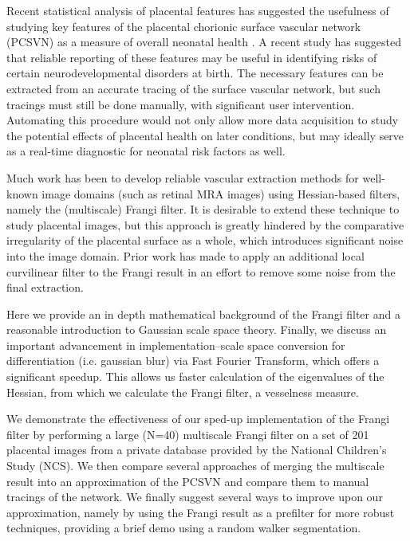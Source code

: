 

Recent statistical analysis of placental features has suggested the usefulness
of studying key features of the placental chorionic surface vascular network
(PCSVN) as a measure of overall neonatal health \cite{chang2017}. A recent
study has suggested that reliable reporting of these features may be useful in
identifying risks of certain neurodevelopmental disorders at birth. The
necessary features can be extracted from an accurate tracing of the surface
vascular network, but such tracings must still be done manually, with
significant user intervention. Automating this procedure would not only allow
more data acquisition to study the potential effects of placental health on
later conditions, but may ideally serve as a real-time diagnostic for neonatal
risk factors as well.

Much work has been to develop reliable vascular extraction methods for
well-known image domains (such as retinal MRA images) using Hessian-based
filters, namely the (multiscale) Frangi filter. It is desirable to extend these
technique to study placental images, but this approach is greatly hindered by
the comparative irregularity of the placental surface as a whole, which
introduces significant noise into the image domain.  Prior work
\cite{huynh2013filter} has made to apply an additional local curvilinear filter
to the Frangi result in an effort to remove some noise from the final
extraction.

Here we provide an in depth mathematical background of the Frangi filter and a
reasonable introduction to Gaussian scale space theory. Finally, we discuss an
important advancement in implementation--scale space conversion for
differentiation (i.e. gaussian blur) via Fast Fourier Transform, which offers a
significant speedup. This allows us faster calculation of the eigenvalues of
the Hessian, from which we calculate the Frangi filter, a vesselness measure.

We demonstrate the effectiveness of our sped-up implementation of the Frangi
filter by performing a large (N=40) multiscale Frangi filter on a set of 201
placental images from a private database provided by the National Children's
Study (NCS). We then compare several approaches of merging the multiscale
result into an approximation of the PCSVN and compare them to manual tracings
of the network. We finally suggest several ways to improve upon our
approximation, namely by using the Frangi result as a prefilter for more robust
techniques, providing a brief demo using a random walker segmentation.


